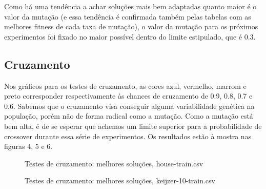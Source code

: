 \documentclass[11pt]{article}
\begin{document}
Como há uma tendência a achar soluções mais bem adaptadas quanto maior é o valor da mutação (e essa tendência é confirmada também pelas tabelas com as melhores fitness de cada taxa de mutação), o valor da mutação para os próximos experimentos foi fixado no maior possível dentro do limite estipulado, que é 0.3.

\subsection{Cruzamento}

Nos gráficos para os testes de cruzamento, as cores azul, vermelho, marrom e preto corresponder respectivamente às chances de cruzamento de 0.9, 0.8, 0.7 e 0.6. Sabemos que o cruzamento visa conseguir alguma variabilidade genética na população, porém não de forma radical como a mutação. Como a mutação está bem alta, é de se esperar que achemos um limite superior para a probabilidade de crossover durante essa série de experimentos. Os resultados estão à mostra nas figuras 4, 5 e 6.

\begin{figure}[!ht]
	\centering
    \caption{Testes de cruzamento: melhores soluções, house-train.csv}
    \label{fig:data}
\end{figure}

\begin{figure}[!ht]
	\centering
    \caption{Testes de cruzamento: melhores soluções, keijzer-10-train.csv}
    \label{fig:data}
\end{figure}
\end{document}
